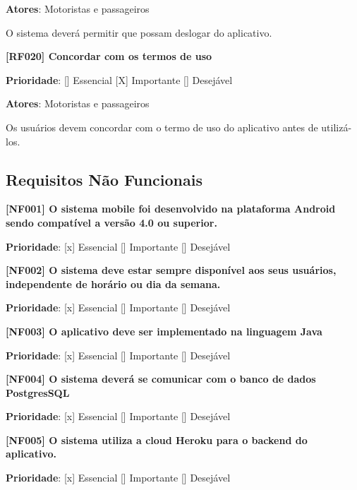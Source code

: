 \textbf{Atores}: Motoristas e passageiros

O sistema deverá permitir que possam deslogar do aplicativo.

\textbf{[RF020] Concordar com os termos de uso} 

\textbf{Prioridade}:      [] Essencial        [X] Importante     [] Desejável 

\textbf{Atores}: Motoristas e passageiros

Os usuários devem concordar com o termo de uso do aplicativo antes de utilizá-los.


\subsection{Requisitos Não Funcionais}

\textbf{[NF001] O sistema mobile foi desenvolvido na plataforma Android sendo compatível a versão 4.0 ou superior. %
}

\textbf{Prioridade}:      [x] Essencial        [] Importante     [] Desejável 



\textbf{[NF002] O sistema deve estar sempre disponível  aos seus usuários, independente de horário ou dia da semana. %
}

\textbf{Prioridade}:      [x] Essencial        [] Importante     [] Desejável 

\textbf{[NF003] O aplicativo deve ser implementado na linguagem Java}


\textbf{Prioridade}:      [x] Essencial        [] Importante     [] Desejável 





\textbf{[NF004] O sistema deverá se comunicar com o banco de dados PostgresSQL}

\textbf{Prioridade}:      [x] Essencial        [] Importante     [] Desejável 

\textbf{[NF005] O sistema utiliza a cloud Heroku para o backend do aplicativo.}

\textbf{Prioridade}:      [x] Essencial        [] Importante     [] Desejável 












